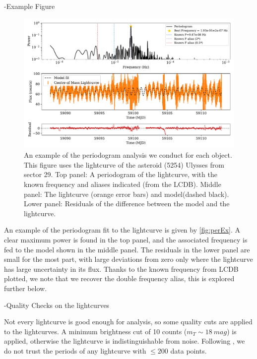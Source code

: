 \documentclass[12pt]{article}
\begin{document}
-Example Figure

\begin{figure}[!t]
    \centering
    \includegraphics[width=\textwidth]{PeriodogramUlyssesPaperFigDraft.pdf}
    \caption{An example of the periodogram analysis we conduct for each object.
        This figure uses the lightcurve of the asteroid (5254) Ulysses from sector 29.
        Top panel: A periodogram of the lightcurve, with the known frequency and aliases indicated (from the LCDB).
        Middle panel: The lightcurve (orange error bars) and model(dashed black).
        Lower panel: Residuals of the difference between the model and the lightcurve.}
    \label{fig:perEx}
\end{figure}

An example of the periodogram fit to the lightcurve is given by \autoref{fig:perEx}.
A clear maximum power is found in the top panel, and the associated frequency is fed to the model shown in the middle panel.
The residuals in the lower panel are small for the most part, with large deviations from zero only where the lightcurve has large uncertainty in its flux.
Thanks to the known frequency from LCDB plotted, we note that we recover the double frequency alias, this is explored further below.

-Quality Checks on the lightcurves

Not every lightcurve is good enough for analysis, so some quality cuts are applied to the lightcurves.
A minimum brightness cut of 10 counts ($m_T \sim \qty{18}{mag}$) %
is applied, otherwise the lightcurve is indistinguishable from noise. %
Following \citeauthor{McNeill2023}, we do not trust the periods of any lightcurve with $\leq 200$ data points.
\end{document}
